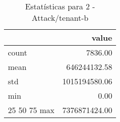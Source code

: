 \begin{table}[htbp]
\caption{Estatísticas para 2 - Attack/tenant-b}
\label{tab:2_-_attack_tenant-b_summary}
\begin{tabular}{lr}
\toprule
 & value \\
\midrule
count & 7836.00 \\
mean & 646244132.58 \\
std & 1015194580.06 \\
min & 0.00 \\
25%
50%
75%
max & 7376871424.00 \\
\bottomrule
\end{tabular}
\end{table}
